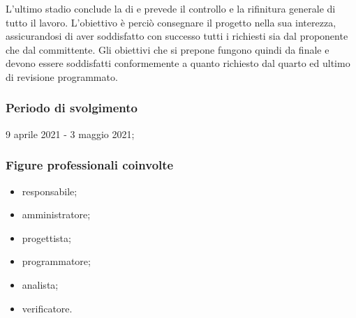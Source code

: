 L'ultimo stadio conclude la  di  e prevede il controllo e la rifinitura generale di tutto il lavoro. L'obiettivo è perciò consegnare il progetto nella sua interezza, assicurandosi di aver soddisfatto con successo tutti i  richiesti sia dal proponente che dal committente. Gli obiettivi che si prepone fungono quindi da  finale e devono essere soddisfatti conformemente a quanto richiesto dal quarto ed ultimo  di revisione programmato.
        
        \subsubsection{Periodo di svolgimento}
        9 aprile 2021 - 3 maggio 2021;
        
        \subsubsection{Figure professionali coinvolte}
            \begin{itemize}
                \item responsabile;
                \item amministratore;
                \item progettista;
                \item programmatore;
                \item analista;
                \item verificatore.
            \end{itemize}

